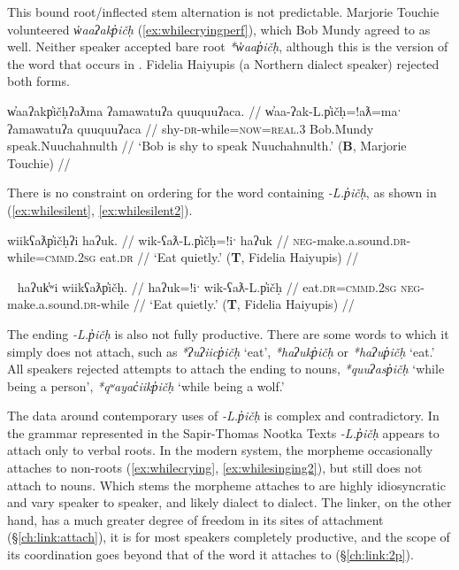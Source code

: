 This bound root/inflected stem alternation is not predictable. Marjorie Touchie volunteered \textit{w̓aaʔakp̓ičḥ} (\ref{ex:whilecryingperf}), which Bob Mundy agreed to as well. Neither speaker accepted bare root \textit{*w̓aap̓ičḥ}, although this is the version of the word that occurs in \citet{sapir1939}. Fidelia Haiyupis (a Northern dialect speaker) rejected both forms.

\ex \label{ex:whilecryingperf}
\begingl
\glpreamble w̓aaʔakp̓ičḥʔaƛma ʔamawatuʔa quuquuʔaca. //
\gla w̓aa-ʔak-L.p̓ičḥ=!aƛ=maˑ ʔamawatuʔa quuquuʔaca //
\glb shy-\textsc{dr}-while=\textsc{now}=\textsc{real.3} Bob.Mundy speak.Nuuchahnulth //
\glft `Bob is shy to speak Nuuchahnulth.' (\textbf{B}, Marjorie Touchie) //
\endgl
\xe

There is no constraint on ordering for the word containing \textit{-L.p̓ičḥ}, as shown in (\ref{ex:whilesilent}, \ref{ex:whilesilent2}).

\ex \label{ex:whilesilent}
\begingl
\glpreamble wiikʕaƛp̓ičḥʔi haʔuk. //
\gla wik-ʕaƛ-L.p̓ičḥ=!iˑ haʔuk //
\glb \textsc{neg}-make.a.sound.\textsc{dr}-while=\textsc{cmmd.2sg} eat.\textsc{dr} //
\glft `Eat quietly.' (\textbf{T}, Fidelia Haiyupis) //
\endgl
\xe

\ex~ \label{ex:whilesilent2}
\begingl
\glpreamble haʔuk̓ʷi wiikʕaƛp̓ičḥ. //
\gla haʔuk=!iˑ wik-ʕaƛ-L.p̓ičḥ //
\glb eat.\textsc{dr}=\textsc{cmmd.2sg} \textsc{neg}-make.a.sound.\textsc{dr}-while //
\glft `Eat quietly.' (\textbf{T}, Fidelia Haiyupis) //
\endgl
\xe

The ending \textit{-L.p̓ičḥ} is also not fully productive. There are some words to which it simply does not attach, such as \textit{*ʔuʔiicp̓ičḥ} `eat', \textit{*haʔukp̓ičḥ} or \textit{*haʔup̓ičḥ} `eat.' All speakers rejected attempts to attach the ending to nouns, \textit{*quuʔasp̓ičḥ} `while being a person', \textit{*qʷayac̓iikp̓ičḥ} `while being a wolf.'

The data around contemporary uses of \textit{-L.p̓ičḥ} is complex and contradictory. In the grammar represented in the Sapir-Thomas Nootka Texts \citep{sapir1939} \textit{-L.p̓ičḥ} appears to attach only to verbal roots. In the modern system, the morpheme occasionally attaches to non-roots (\ref{ex:whilecrying}, \ref{ex:whilesinging2}), but still does not attach to nouns. Which stems the morpheme attaches to are highly idiosyncratic and vary speaker to speaker, and likely dialect to dialect. The linker, on the other hand, has a much greater degree of freedom in its sites of attachment (\S\ref{ch:link:attach}), it is for most speakers completely productive, and the scope of its coordination goes beyond that of the word it attaches to (\S\ref{ch:link:2p}).

